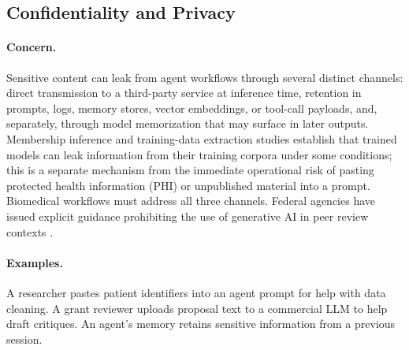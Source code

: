 \documentclass[11pt,letterpaper]{article}
\begin{document}
\subsection{Confidentiality and Privacy}

\paragraph{Concern.} Sensitive content can leak from agent workflows through several distinct channels: direct transmission to a third-party service at inference time, retention in prompts, logs, memory stores, vector embeddings, or tool-call payloads, and, separately, through model memorization that may surface in later outputs. Membership inference and training-data extraction studies \cite{shokri2017,carlini2021} establish that trained models can leak information from their training corpora under some conditions; this is a separate mechanism from the immediate operational risk of pasting protected health information (PHI) or unpublished material into a prompt. Biomedical workflows must address all three channels. Federal agencies have issued explicit guidance prohibiting the use of generative AI in peer review contexts \cite{nih_ai_peerreview,nsf_ai_notice}.

\paragraph{Examples.} A researcher pastes patient identifiers into an agent prompt for help with data cleaning. A grant reviewer uploads proposal text to a commercial LLM to help draft critiques. An agent's memory retains sensitive information from a previous session.
\end{document}
